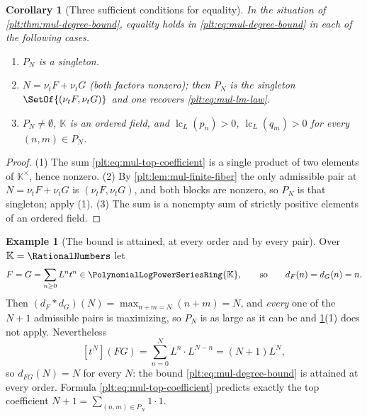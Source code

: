 \documentclass[11pt,oneside]{article}
\theoremstyle{plain}
\newtheorem{corollary}[theorem]{Corollary}
\theoremstyle{definition}
\newtheorem{example}[theorem]{Example}
\theoremstyle{remark}
\newcommand{\K}{\mathbb{K}}
\newcommand{\PLpow}{\PolynomialLogPowerSeriesRing{\K}}   %
\newcommand{\ordt}{\nu_{t}}                              %
\DeclareMathOperator{\lc}{lc}
\newcommand{\dprofile}[1]{d_{#1}}                        %
\begin{document}
\begin{corollary}[Three sufficient conditions for equality]
\label{plt:cor:mul-degree-equality}
In the situation of \cref{plt:thm:mul-degree-bound}, equality holds in
\eqref{plt:eq:mul-degree-bound} in each of the following cases.
\begin{enumerate}
\item $P_N$ is a singleton.
\item $N=\ordt F+\ordt G$ (both factors nonzero); then $P_N$ is the
singleton $\SetOf{(\ordt F,\ordt G)}$ and one recovers
\eqref{plt:eq:mul-lm-law}.
\item $P_N\ne\emptyset$, $\K$ is an ordered field, and $\lc_L(p_n)>0$,
$\lc_L(q_m)>0$ for every $(n,m)\in P_N$.
\end{enumerate}
\end{corollary}

\begin{proof}
(1) The sum \eqref{plt:eq:mul-top-coefficient} is a single product of two
elements of $\K^\times$, hence nonzero.  (2) By
\cref{plt:lem:mul-finite-fiber} the only admissible pair at
$N=\ordt F+\ordt G$ is $(\ordt F,\ordt G)$, and both blocks are nonzero, so
$P_N$ is that singleton; apply (1).  (3) The sum is a nonempty sum of
strictly positive elements of an ordered field.
\end{proof}

\begin{example}[The bound is attained, at every order and by every pair]
\label{plt:ex:mul-degree-sharp}
Over $\K=\RationalNumbers$ let
\[
 F=G=\sum_{n\ge0}L^nt^n\in\PLpow,
 \qquad\text{so}\qquad
 \dprofile{F}(n)=\dprofile{G}(n)=n .
\]
Then $(\dprofile{F}\ast\dprofile{G})(N)=\max_{n+m=N}(n+m)=N$, and
\emph{every} one of the $N+1$ admissible pairs is maximizing, so $P_N$ is as
large as it can be and \cref{plt:cor:mul-degree-equality}(1) does not apply.
Nevertheless
\[
 [t^N](FG)=\sum_{n=0}^{N}L^n\cdot L^{N-n}=(N+1)L^N,
\]
so $\dprofile{FG}(N)=N$ for every $N$: the bound
\eqref{plt:eq:mul-degree-bound} is attained at every order.  Formula
\eqref{plt:eq:mul-top-coefficient} predicts exactly the top coefficient
$N+1=\sum_{(n,m)\in P_N}1\cdot1$.
\end{example}
\end{document}
